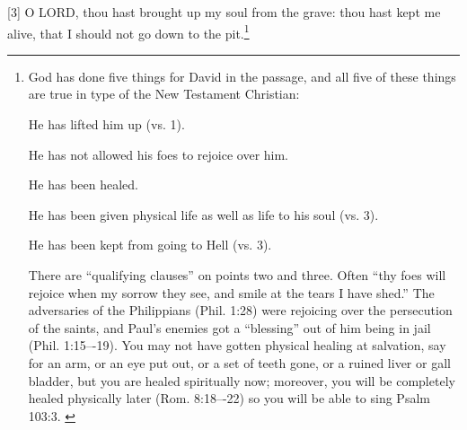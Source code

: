 [3] \textcolor[rgb]{0.00,0.00,1.00}{O LORD, thou hast brought up my soul from the grave: thou hast kept me alive, that I should not go down to the pit.}\footnote{God has done five things for David in the passage, and all five of these things are true in type of the New Testament Christian:
\begin{compactenum}
	\item He has lifted him up (vs. 1).
	\item He has not allowed his foes to rejoice over him. 
	\item He has been healed. 
	\item He has been given physical life as well as life to his soul (vs. 3). 
	\item He has been kept from going to Hell (vs. 3). 
\end{compactenum}
There are “qualifying clauses” on points two and three. Often ``thy foes will rejoice when my sorrow they see, and smile at the tears I have shed.'' The adversaries of the Philippians (Phil. 1:28) were rejoicing over the persecution of the saints, and Paul’s enemies got a ``blessing'' out of him being in jail (Phil. 1:15–-19). You may not have gotten physical healing at salvation, say for an arm, or an eye put out, or a set of teeth gone, or a ruined liver or gall bladder, but you are healed spiritually now; moreover, you will be completely healed physically later (Rom. 8:18–-22) so you will be able to sing Psalm 103:3. \cite{Ruckman1992Psalms} }
